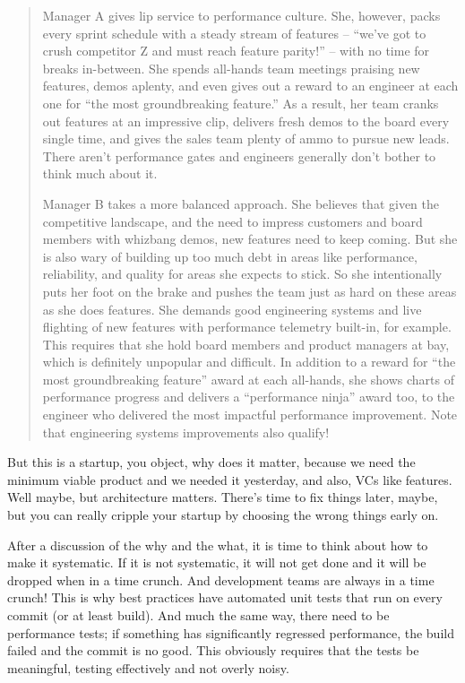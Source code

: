 \documentclass[a4paper]{report}
\begin{document}
\begin{quote}
Manager A gives lip service to performance culture. She, however, packs every sprint schedule with a steady stream of features -- ``we've got to crush competitor Z and must reach feature parity!'' -- with no time for breaks in-between. She spends all-hands team meetings praising new features, demos aplenty, and even gives out a reward to an engineer at each one for ``the most groundbreaking feature.'' As a result, her team cranks out features at an impressive clip, delivers fresh demos to the board every single time, and gives the sales team plenty of ammo to pursue new leads. There aren't performance gates and engineers generally don't bother to think much about it.

Manager B takes a more balanced approach. She believes that given the competitive landscape, and the need to impress customers and board members with whizbang demos, new features need to keep coming. But she is also wary of building up too much debt in areas like performance, reliability, and quality for areas she expects to stick. So she intentionally puts her foot on the brake and pushes the team just as hard on these areas as she does features. She demands good engineering systems and live flighting of new features with performance telemetry built-in, for example. This requires that she hold board members and product managers at bay, which is definitely unpopular and difficult. In addition to a reward for ``the most groundbreaking feature'' award at each all-hands, she shows charts of performance progress and delivers a ``performance ninja'' award too, to the engineer who delivered the most impactful performance improvement. Note that engineering systems improvements also qualify!
\end{quote}

But this is a startup, you object, why does it matter, because we need the minimum viable product and we needed it yesterday, and also, VCs like features. Well maybe, but architecture matters. There's time to fix things later, maybe, but you can really cripple your startup by choosing the wrong things early on. 

After a discussion of the why and the what, it is time to think about how to make it systematic. If it is not systematic, it will not get done and it will be dropped when in a time crunch. And development teams are always in a time crunch! This is why best practices have automated unit tests that run on every commit (or at least build). And much the same way, there need to be performance tests; if something has significantly regressed performance, the build failed and the commit is no good. This obviously requires that the tests be meaningful, testing effectively and not overly noisy. 
\end{document}
